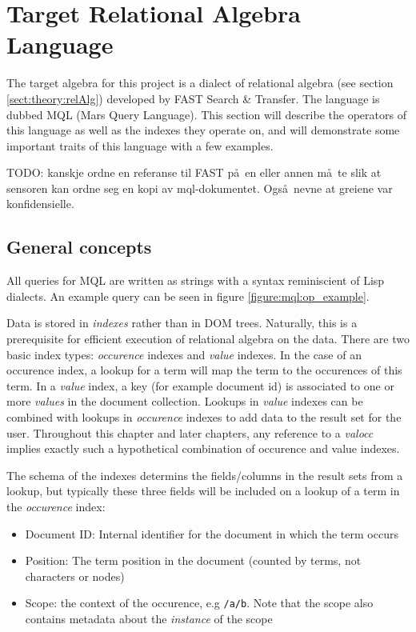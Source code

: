 \section{Target Relational Algebra Language}
\label{sect:method:mql}
The target algebra for this project is a dialect of relational algebra (see
section \ref{sect:theory:relAlg}) developed by FAST Search \& Transfer. The
language is dubbed MQL (Mars Query Language). This section will describe the
operators of this language as well as the indexes they operate on, and will
demonstrate some important traits of this language with a few examples. 

TODO: kanskje ordne en referanse til FAST p\aa~en eller annen m\aa~te slik at
sensoren kan ordne seg en kopi av mql-dokumentet. Ogs\aa~nevne at greiene var
konfidensielle.

\subsection{General concepts}
\label{sect:method:mql:indexes}
\label{sect:method:mql:concepts}
All queries for MQL are written as strings with a syntax reminiscient of Lisp
dialects. An example query can be seen in figure \ref{figure:mql:op_example}.

Data is stored in \textit{indexes} rather than in DOM trees. Naturally, this is a prerequisite for efficient
execution of relational algebra on the data. There are two basic index types: \textit{occurence} indexes and
\textit{value} indexes. In the case of an occurence index, a lookup for a term will map the term to the occurences
of this term. In a \textit{value} index, a key (for example document id) is associated to one or more
\textit{values} in the document collection. Lookups in \textit{value} indexes can be combined with lookups in
\textit{occurence} indexes to add data to the result set for the user.
Throughout this chapter and later chapters, any reference to a \textit{valocc}
implies exactly such a hypothetical combination of occurence and value indexes.

The schema of the indexes determins the fields/columns in the result sets from
a lookup, but typically these three fields will be included on a lookup of a
term in the \textit{occurence} index:
\begin{itemize}
  \item Document ID: Internal identifier for the document in which the term
  occurs
  \item Position: The term position in the document (counted by terms, not
  characters or nodes)
  \item Scope: the context of the occurence, e.g \texttt{/a/b}. Note that the
  scope also contains metadata about the \textit{instance} of the scope
\end{itemize}


